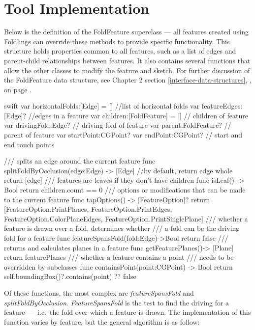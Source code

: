 \section{Tool Implementation}\label{tool-implementation}

Below is the definition of the FoldFeature superclass --- all features
created using Foldlings can override these methods to provide specific
functionality. This structure holds properties common to all features,
such as a list of edges and parent-child relationships between features.
It also contains several functions that allow the other classes to
modify the feature and sketch. For further discussion of the FoldFeature
data structure, see Chapter 2 section \ref{interface-data-structures},
, on page
\pageref{interface-data-structures}.

\small
\singlespacing 

\begin{pygmented}{swift}
var horizontalFolds:[Edge] = [] //list of horizontal folds
var featureEdges:[Edge]?        //edges in a feature
var children:[FoldFeature] = [] // children of feature
var drivingFold:Edge? // driving fold of feature
var parent:FoldFeature? // parent of feature
var startPoint:CGPoint?
var endPoint:CGPoint? // start and end touch points

/// splits an edge around the current feature
func splitFoldByOcclusion(edge:Edge) -> [Edge]
{
//by default, return edge whole
return [edge]
}
/// features are leaves if they don't have children
func isLeaf() -> Bool
{
return children.count == 0
}
/// options or modifications that can be made to the current feature
func tapOptions() -> [FeatureOption]?
{
  return [FeatureOption.PrintPlanes, FeatureOption.PrintEdges,
  FeatureOption.ColorPlaneEdges, FeatureOption.PrintSinglePlane]
}
/// whether a feature is drawn over a fold, determines whether 
/// a fold can be the driving fold for a feature
  func featureSpansFold(fold:Edge)->Bool
{
  return false
}
/// returns and calculates planes in a feature
func getFeaturePlanes()-> [Plane]{
  return featurePlanes
}
/// whether a feature contains a point
/// needs to be overridden by subclasses
func containsPoint(point:CGPoint) -> Bool{
  return self.boundingBox()?.contains(point) ?? false
}
\end{pygmented}

\doublespacing
\normalsize

Of these functions, the most complex are \emph{featureSpansFold} and
\emph{splitFoldByOcclusion}. \emph{FeatureSpansFold} is the test to find
the driving for a feature ---~i.e.~the fold over which a feature is
drawn. The implementation of this function varies by feature, but the
general algorithm is as follow:

